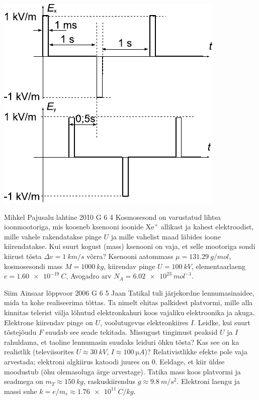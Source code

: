 \documentclass[11pt, twoside]{article}
\begin{document}
{{\begin{center}
	\includegraphics[width=0.6\linewidth]{2009-v2g-06-yl}
\end{center}
\fi
}

{Mihkel Pajusalu} %
{lahtine} %
{2010} %
{G 6} %
{4} %
{
\ifStatement
Kosmosesond on varustatud lihtsa ioonmootoriga, mis koosneb ksenooni
ioonide $\mathrm{Xe}^+$ allikast ja kahest elektroodist, mille vahele rakendatakse pinge
$U$ ja mille vahelist maad läbides ioone kiirendatakse. Kui suurt kogust
(mass) ksenooni on vaja, et selle mootoriga sondi kiirust tõsta
$\Delta v=\SI{1}{km/s}$ võrra?
%
Ksenooni aatommass $\mu=\SI{131,29}{g/mol}$, kosmosesondi mass $M=\SI{1000}{kg}$, kiirendav pinge
$U=\SI{100}{kV}$, elementaarlaeng $e=\SI{1,60 e-19}{C}$, Avogadro arv
$N_A= \SI{6,02 e23}{mol^{-1}}$.
\fi
}

{Siim Ainsaar} %
{lõppvoor} %
{2006} %
{G 6} %
{5} %
{
\ifStatement
Jaan Tatikal tuli järjekordne lennumasinaidee, mida ta kohe realiseerima tõttas. Ta nimelt ehitas palkidest platvormi, mille alla kinnitas telerist välja lõhutud elektronkahuri koos vajaliku elektroonika ja akuga. Elektrone kiirendav pinge on $U$, voolutugevus elektronkiires $I$. Leidke, kui suurt tõstejõudu $F$ suudab see seade tekitada. Missugust tingimust peaksid $U$ ja $I$ rahuldama, et taoline lennumasin suudaks leiduri õhku tõsta? Kas see on ka realistlik (televiisorites $U \approx \SI{30}{kV}$, $I \approx \SI{100}{\micro A}$)? Relativistlikke efekte pole vaja arvestada; elektroni algkiirus katoodi juures on 0. Eeldage, et kiir üldse moodustub (õhu olemasoluga ärge arvestage). Tatika mass koos platvormi ja seadmega on $m_T \approx \SI{150}{kg}$, raskuskiirendus $g \approx \SI{9,8}{m/s^2}$. Elektroni laengu ja massi suhe $k = e/m_e \approx \SI{1,76e11}{C/kg}$.
\fi
}

}
\end{document}
